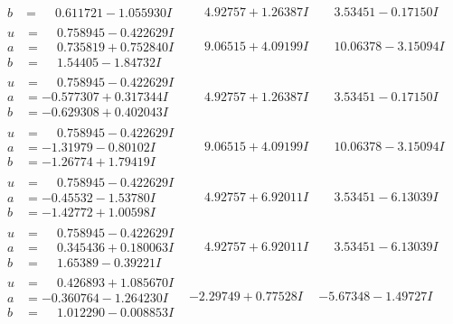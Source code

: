 \documentclass[1p]{elsarticle_modified}
\theoremstyle{definition}
\begin{document}
$$\begin{array}{c|c|c}
\begin{aligned}
b &= \phantom{-}0.611721 - 1.055930 I\end{aligned}
 & \phantom{-}4.92757 + 1.26387 I & \phantom{-}3.53451 - 0.17150 I \\ \hline\begin{aligned}
u &= \phantom{-}0.758945 - 0.422629 I \\
a &= \phantom{-}0.735819 + 0.752840 I \\
b &= \phantom{-}1.54405 - 1.84732 I\end{aligned}
 & \phantom{-}9.06515 + 4.09199 I & \phantom{-}10.06378 - 3.15094 I \\ \hline\begin{aligned}
u &= \phantom{-}0.758945 - 0.422629 I \\
a &= -0.577307 + 0.317344 I \\
b &= -0.629308 + 0.402043 I\end{aligned}
 & \phantom{-}4.92757 + 1.26387 I & \phantom{-}3.53451 - 0.17150 I \\ \hline\begin{aligned}
u &= \phantom{-}0.758945 - 0.422629 I \\
a &= -1.31979 - 0.80102 I \\
b &= -1.26774 + 1.79419 I\end{aligned}
 & \phantom{-}9.06515 + 4.09199 I & \phantom{-}10.06378 - 3.15094 I \\ \hline\begin{aligned}
u &= \phantom{-}0.758945 - 0.422629 I \\
a &= -0.45532 - 1.53780 I \\
b &= -1.42772 + 1.00598 I\end{aligned}
 & \phantom{-}4.92757 + 6.92011 I & \phantom{-}3.53451 - 6.13039 I \\ \hline\begin{aligned}
u &= \phantom{-}0.758945 - 0.422629 I \\
a &= \phantom{-}0.345436 + 0.180063 I \\
b &= \phantom{-}1.65389 - 0.39221 I\end{aligned}
 & \phantom{-}4.92757 + 6.92011 I & \phantom{-}3.53451 - 6.13039 I \\ \hline\begin{aligned}
u &= \phantom{-}0.426893 + 1.085670 I \\
a &= -0.360764 - 1.264230 I \\
b &= \phantom{-}1.012290 - 0.008853 I\end{aligned}
 & -2.29749 + 0.77528 I & -5.67348 - 1.49727 I \\ \hline\begin{aligned}

\end{aligned}
\end{array}$$
\end{document}
